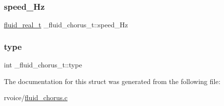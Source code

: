 \mbox{\label{struct__fluid__chorus__t_adb880e1d8d336fe02103280029994330}} 
\subsubsection{\texorpdfstring{speed\+\_\+\+Hz}{speed\_Hz}}
{\footnotesize\ttfamily \hyperlink{fluidsynth__priv_8h_a9e96f0917747b69cabb7c671bc693dbb}{fluid\+\_\+real\+\_\+t} \+\_\+fluid\+\_\+chorus\+\_\+t\+::speed\+\_\+\+Hz}

\mbox{\label{struct__fluid__chorus__t_acfb4123e8db4196bf4329ec04e04e3ef}} 
\subsubsection{\texorpdfstring{type}{type}}
{\footnotesize\ttfamily int \+\_\+fluid\+\_\+chorus\+\_\+t\+::type}



The documentation for this struct was generated from the following file\+:\begin{DoxyCompactItemize}
\item 
rvoice/\hyperlink{fluid__chorus_8c}{fluid\+\_\+chorus.\+c}\end{DoxyCompactItemize}
